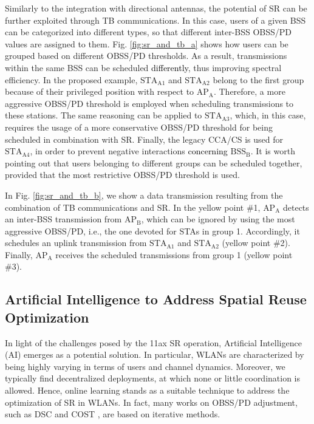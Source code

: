 \documentclass{ieeeaccess}
\begin{document}
Similarly to the integration with directional antennas, the potential of SR can be further exploited through TB communications. In this case, users of a given BSS can be categorized into different types, so that different inter-BSS OBSS/PD values are assigned to them. Fig. \ref{fig:sr_and_tb_a} shows how users can be grouped based on different OBSS/PD thresholds. As a result, transmissions within the same BSS can be scheduled \textcolor{black}{differently}, thus improving spectral efficiency. In the proposed example, $\text{STA}_\text{A1}$ and $\text{STA}_\text{A2}$ belong to the first group because of their privileged position with respect to $\text{AP}_\text{A}$. Therefore, a more aggressive OBSS/PD threshold is employed when scheduling transmissions to these stations. The same reasoning can be applied to $\text{STA}_\text{A3}$, which, in this case, requires the usage of a more conservative OBSS/PD threshold for being scheduled in combination with SR. Finally, the legacy CCA/CS is used for $\text{STA}_\text{A4}$, in order to prevent negative interactions \textcolor{black}{concerning} $\text{BSS}_\text{B}$. It is worth pointing out that users belonging to different groups can be scheduled together, provided that the most restrictive OBSS/PD threshold is used. 

In Fig. \ref{fig:sr_and_tb_b}, we show a data transmission resulting from the combination of TB communications and SR. In the yellow point \#1, $\text{AP}_\text{A}$ detects an inter-BSS transmission from $\text{AP}_\text{B}$, which can be ignored by using the most aggressive OBSS/PD, i.e., the one devoted for STAs in group 1. Accordingly, it schedules an uplink transmission from $\text{STA}_\text{A1}$ and $\text{STA}_\text{A2}$ (yellow point \#2). Finally, $\text{AP}_\text{A}$ receives the scheduled transmissions from group 1 (yellow point \#3).

\subsection{Artificial Intelligence to Address Spatial Reuse Optimization}
In light of the challenges posed by the 11ax SR operation, Artificial Intelligence (AI) emerges as a potential solution. In particular, WLANs are characterized by being highly varying in terms of users and channel dynamics. Moreover, we typically find decentralized deployments, at which none or little coordination is allowed. Hence, online learning stands as a suitable technique to address the optimization of SR in WLANs. In fact, many works on OBSS/PD adjustment, such as DSC \cite{smith2015dynamic} and COST \cite{selinis2018control}, are based on iterative methods. 
\end{document}
